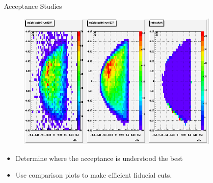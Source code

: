 \documentclass{beamer}
\begin{document}
\begin{frame}
	\vspace{-10pt}
	\begin{block}{Acceptance Studies}
		\begin{figure}
			\includegraphics[width=10cm]{../images/xpyp_comp}
		\end{figure}
		\vspace{-20pt}
		\begin{itemize}
			\item Determine where the acceptance is understood the best
			\item Use comparison plots to make efficient fiducial cuts. 
		\end{itemize}
	
	\end{block}
\end{frame}
\end{document}
